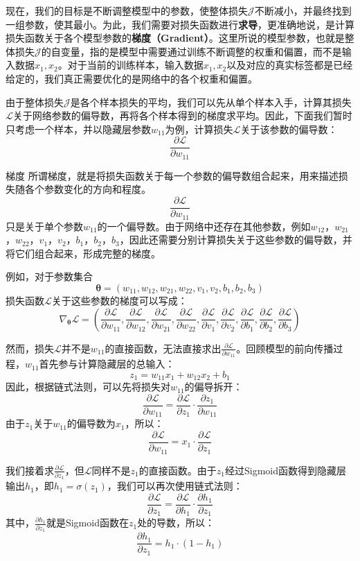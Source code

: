 现在，我们的目标是不断调整模型中的参数，使整体损失$\mathcal{J}$不断减小，并最终找到一组参数，使其最小。为此，我们需要对损失函数进行\textbf{求导}，更准确地说，是计算损失函数关于各个模型参数的\textbf{梯度（Gradient）}。这里所说的模型参数，也就是整体损失$\mathcal{J}$的自变量，指的是模型中需要通过训练不断调整的权重和偏置，而不是输入数据$x_1,x_2$。对于当前的训练样本，输入数据$x_1,x_2$以及对应的真实标签都是已经给定的，我们真正需要优化的是网络中的各个权重和偏置。

由于整体损失$\mathcal{J}$是各个样本损失的平均，我们可以先从单个样本入手，计算其损失$\mathcal{L}$关于网络参数的偏导数，再将各个样本得到的梯度求平均。因此，下面我们暂时只考虑一个样本，并以隐藏层参数$w_{11}$为例，计算损失$\mathcal{L}$关于该参数的偏导数：
$$
\frac{\partial\mathcal{L}}{\partial w_{11}}
$$

\begin{orangeBox}{梯度}
所谓梯度，就是将损失函数关于每一个参数的偏导数组合起来，用来描述损失随各个参数变化的方向和程度。
$$
\frac{\partial\mathcal{L}}{\partial w_{11}}
$$
只是关于单个参数$w_{11}$的一个偏导数。由于网络中还存在其他参数，例如$w_{12}$，$w_{21}$，$w_{22}$，$v_1$，$v_2$，$b_1$，$b_2$，$b_3$，因此还需要分别计算损失关于这些参数的偏导数，并将它们组合起来，形成完整的梯度。

例如，对于参数集合
$$
\boldsymbol{\theta} = (w_{11},w_{12},w_{21},w_{22},v_1,v_2,b_1,b_2,b_3)
$$
损失函数$\mathcal{L}$关于这些参数的梯度可以写成：
$$
\nabla_{\boldsymbol{\theta}}\mathcal{L}
=
\left(
\frac{\partial\mathcal{L}}{\partial w_{11}},
\frac{\partial\mathcal{L}}{\partial w_{12}},
\frac{\partial\mathcal{L}}{\partial w_{21}},
\frac{\partial\mathcal{L}}{\partial w_{22}},
\frac{\partial\mathcal{L}}{\partial v_1},
\frac{\partial\mathcal{L}}{\partial v_2},
\frac{\partial\mathcal{L}}{\partial b_1},
\frac{\partial\mathcal{L}}{\partial b_2},
\frac{\partial\mathcal{L}}{\partial b_3}
\right)
$$
\end{orangeBox}

然而，损失$\mathcal{L}$并不是$w_{11}$的直接函数，无法直接求出$\frac{\partial\mathcal{L}}{\partial w_{11}}$。回顾模型的前向传播过程，$w_{11}$首先参与计算隐藏层的总输入：
$$
z_1=w_{11}x_1+w_{12}x_2+b_1
$$
因此，根据链式法则，可以先将损失对$w_{11}$的偏导拆开：
$$
\frac{\partial\mathcal{L}}{\partial w_{11}}=\frac{\partial\mathcal{L}}{\partial z_1} \cdot \frac{\partial z_1}{\partial w_{11}}
$$
由于$z_1$关于$w_{11}$的偏导数为$x_1$，所以：
$$
\frac{\partial\mathcal{L}}{\partial w_{11}}=x_1 \cdot \frac{\partial\mathcal{L}}{\partial z_1}
$$

我们接着求$\frac{\partial\mathcal{L}}{\partial z_1}$，但$\mathcal{L}$同样不是$z_1$的直接函数。由于$z_1$经过Sigmoid函数得到隐藏层输出$h_1$，即$h_1=\sigma(z_1)$，我们可以再次使用链式法则：
$$
\frac{\partial\mathcal{L}}{\partial z_1}=\frac{\partial\mathcal{L}}{\partial h_1} \cdot \frac{\partial h_1}{\partial z_1}
$$
其中，$\frac{\partial h_1}{\partial z_1}$就是Sigmoid函数在$z_1$处的导数，所以：
$$
\frac{\partial h_1}{\partial z_1}=h_1 \cdot (1-h_1)
$$

